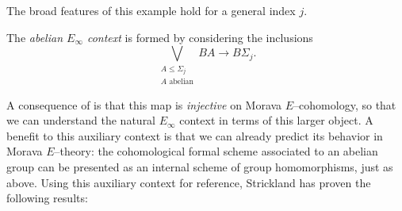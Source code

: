 The broad features of this example hold for a general index \(j\).
\begin{definition}
The \textit{abelian \(E_\infty\) context} is formed by considering the inclusions \[\bigvee_{\substack{A \le \Sigma_j \\ \text{\(A\) abelian}}} BA \to B\Sigma_j.\]
\end{definition}
\noindent A consequence of  is that this map is \emph{injective} on Morava \(E\)--cohomology, so that we can understand the natural \(E_\infty\) context in terms of this larger object.  A benefit to this auxiliary context is that we can already predict its behavior in Morava \(E\)--theory: the cohomological formal scheme associated to an abelian group can be presented as an internal scheme of group homomorphisms, just as above.  Using this auxiliary context for reference, Strickland has proven the following results:

